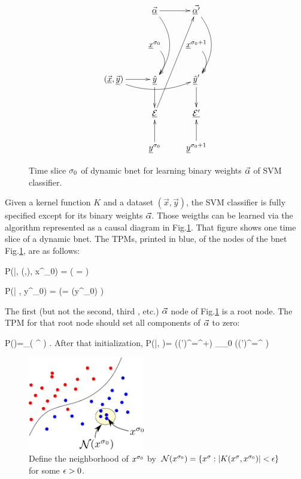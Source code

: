 \begin{figure}[h!]
$$
\xymatrix{
&\vec{\ul{\alp}}\ar@/^1.5pc/[dd]
\ar[r]
&\vec{\ul{\alp}'}\ar@/^1.5pc/[dd]
\\
&\rvx^{\s_0}\ar@/^1pc/[d]
&\rvx^{\s_0+1}\ar@/^1pc/[d]
\\
(\vec{\rvx}, \vec{\rvy})\ar[r]
\ar@/_1pc/[rr]
&\ul{\haty}\ar[d]
&\ul{\haty}'\ar[d]
\\
&\ul{\cale}\ar[ruuu]
&\ul{\cale'}
\\
&\rvy^{\s_0}\ar[u]
&\rvy^{\s_0+1}\ar[u]
}
$$
\caption{Time slice $\sigma_0$ of dynamic bnet for 
learning binary weights $\vec{\alpha}$ 
of SVM classifier.
}
\label{fig-svm-bnet}
\end{figure}

Given a kernel function $K$ and a dataset 
$(\vec{x}, \vec{y})$,
the SVM classifier is fully specified
except for its binary weights $\vec{\alpha}$.
Those weigths can be learned via 
the algorithm
represented as a causal diagram  in Fig.\ref{fig-svm-bnet}.
That figure  shows one time slice
of a dynamic bnet.
The TPMs, printed in blue,
of the nodes of 
the bnet Fig.\ref{fig-svm-bnet},
are as follows:



\beq\color{blue}
P(\haty|\vec{\alp}, (,), x^{\s_0})
=
\indi(\;\;\;
\haty= 
\;\;\;)
\eeq  

\beq\color{blue}
P(\cale| \haty, y^{\s_0})
=
\indi(\;\;\;\cale =
\indi(\haty\neq y^{\s_0})
\;\;\;)
\eeq  

The first (but not the second, third , etc.)
$\vec{\alpha}$ 
node of Fig.\ref{fig-svm-bnet}
is a root node.
The TPM for that root node
should set 
all components of $\vec{\alpha}$
to zero:

\beq\color{blue}
P(\vec{\alp})=\prod_\s \indi(\;\;\;
\alp^
\;\;\;)
\;.
\eeq
After that initialization,
\beq\color{blue}
P(|\vec{\alp}, \cale)=
\indi(\;\;\;(\alp')^\s=\alp^\s +\cale\;\;\;)\;\;
\prod_{\s\neq \s_0}
\indi(\;\;\;(\alp')^\s=\alp^\s
\;\;\;)
\eeq

\begin{figure}[h!]
\centering
\includegraphics[width=2in]
{svm/svm-why.png}
\caption{Define the neighborhood
of $x^{\sigma_0}$ by  ${\cal N}(x^{\sigma_0})
=
\{x^\sigma: |K(x^\sigma,  x^{\sigma_0})|<\epsilon \}$
for some $\epsilon>0$.}
\label{fig-svm-why}
\end{figure}

